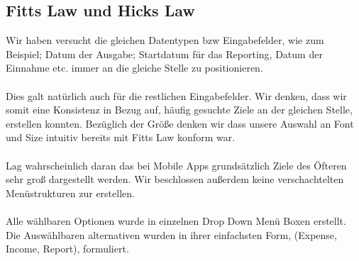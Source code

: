 \documentclass[runningheads,a4paper]{llncs}
\begin{document}
\subsection{Fitts Law und Hicks Law}

Wir haben versucht die gleichen Datentypen bzw Eingabefelder, wie zum Beispiel; Datum der Ausgabe; Startdatum für das Reporting, Datum der Einnahme etc. immer an die gleiche Stelle zu positionieren.\\\\  Dies galt natürlich auch für die restlichen Eingabefelder. Wir denken, dass wir somit eine Konsistenz in Bezug auf, häufig gesuchte Ziele an der gleichen Stelle, erstellen konnten. Bezüglich der Größe denken wir dass unsere Auswahl an Font und Size intuitiv bereits mit Fitts Law konform war.\\\\   Lag wahrscheinlich daran das bei Mobile Apps grundsätzlich Ziele des Öfteren sehr groß dargestellt werden. Wir beschlossen außerdem keine verschachtelten Menüstrukturen zur erstellen. \\\\ Alle wählbaren Optionen wurde in einzelnen Drop Down Menü Boxen erstellt.  Die Auswählbaren alternativen wurden in ihrer einfachsten Form, (Expense, Income, Report), formuliert. 


\begin{figure}
\centering
{}
\hfill
{}
\hfill
{}
\end{figure}
\end{document}
